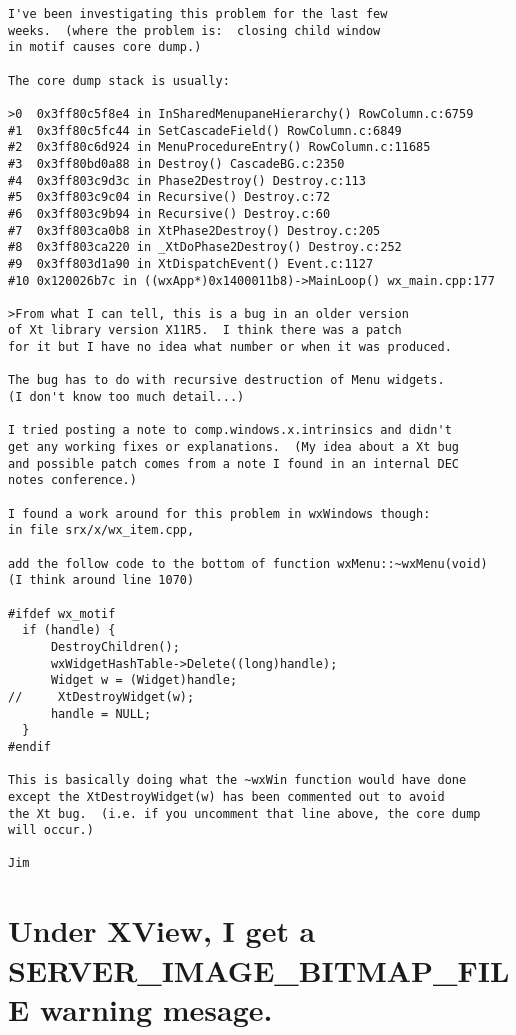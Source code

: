 \begin{verbatim}
I've been investigating this problem for the last few
weeks.  (where the problem is:  closing child window
in motif causes core dump.)

The core dump stack is usually:

>0  0x3ff80c5f8e4 in InSharedMenupaneHierarchy() RowColumn.c:6759
#1  0x3ff80c5fc44 in SetCascadeField() RowColumn.c:6849
#2  0x3ff80c6d924 in MenuProcedureEntry() RowColumn.c:11685
#3  0x3ff80bd0a88 in Destroy() CascadeBG.c:2350
#4  0x3ff803c9d3c in Phase2Destroy() Destroy.c:113
#5  0x3ff803c9c04 in Recursive() Destroy.c:72
#6  0x3ff803c9b94 in Recursive() Destroy.c:60
#7  0x3ff803ca0b8 in XtPhase2Destroy() Destroy.c:205
#8  0x3ff803ca220 in _XtDoPhase2Destroy() Destroy.c:252
#9  0x3ff803d1a90 in XtDispatchEvent() Event.c:1127
#10 0x120026b7c in ((wxApp*)0x1400011b8)->MainLoop() wx_main.cpp:177

>From what I can tell, this is a bug in an older version
of Xt library version X11R5.  I think there was a patch
for it but I have no idea what number or when it was produced.

The bug has to do with recursive destruction of Menu widgets.
(I don't know too much detail...)

I tried posting a note to comp.windows.x.intrinsics and didn't
get any working fixes or explanations.  (My idea about a Xt bug
and possible patch comes from a note I found in an internal DEC
notes conference.)

I found a work around for this problem in wxWindows though:
in file srx/x/wx_item.cpp,

add the follow code to the bottom of function wxMenu::~wxMenu(void)
(I think around line 1070)

#ifdef wx_motif
  if (handle) {
      DestroyChildren();
      wxWidgetHashTable->Delete((long)handle);
      Widget w = (Widget)handle;
//     XtDestroyWidget(w);
      handle = NULL;
  }
#endif

This is basically doing what the ~wxWin function would have done
except the XtDestroyWidget(w) has been commented out to avoid
the Xt bug.  (i.e. if you uncomment that line above, the core dump
will occur.)

Jim
\end{verbatim}

\section{Under XView, I get a SERVER\_IMAGE\_BITMAP\_FILE warning mesage.}

